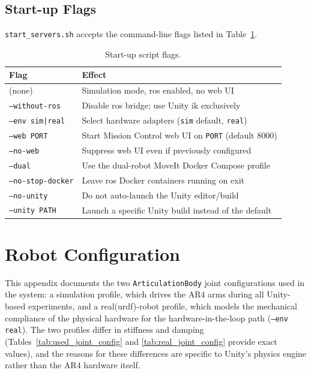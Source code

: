 \documentclass[
     12pt,
     a4paper,
     BCOR=10mm,
     DIV=14,
     listof=totoc,
     bibliography=totoc,
     parskip,
     twoside,
     headsepline
     ]{scrreprt}
\begin{document}
\section{Start-up Flags}\label{sec:startup_flags}
\texttt{start\_servers.sh} accepts the command-line flags listed in Table~\ref{tab:config_startup}.

\begin{table}[ht]
	\centering
	\begin{tabular}{ll}
		\toprule
		\textbf{Flag}             & \textbf{Effect}                                                \\
		\midrule
		(none)                    & Simulation mode, \gls{ros} enabled, no web UI                  \\
		\texttt{--without-ros}    & Disable \gls{ros} bridge; use Unity \gls{ik} exclusively       \\
		\texttt{--env sim|real}   & Select hardware adapters (\texttt{sim} default, \texttt{real}) \\
		\texttt{--web PORT}       & Start Mission Control web UI on \texttt{PORT} (default 8000)   \\
		\texttt{--no-web}         & Suppress web UI even if previously configured                  \\
		\texttt{--dual}           & Use the dual-robot MoveIt Docker Compose profile               \\
		\texttt{--no-stop-docker} & Leave \gls{ros} Docker containers running on exit              \\
		\texttt{--no-unity}       & Do not auto-launch the Unity editor/build                      \\
		\texttt{--unity PATH}     & Launch a specific Unity build instead of the default           \\
		\bottomrule
	\end{tabular}
	\caption{Start-up script flags.}
	\label{tab:config_startup}
\end{table}

\chapter{Robot Configuration}\label{appendix:robot_values}
This appendix documents the two \texttt{ArticulationBody} joint configurations used in the system: a simulation profile, which drives the AR4 arms during all Unity-based experiments, and a real(\gls{urdf})-robot profile, which models the mechanical compliance of the physical hardware for the hardware-in-the-loop path (\texttt{--env real}). The two profiles differ in stiffness and damping (Tables~\ref{tab:used_joint_config} and \ref{tab:real_joint_config} provide exact values), and the reasons for these differences are specific to Unity's physics engine rather than the AR4 hardware itself.
\end{document}
